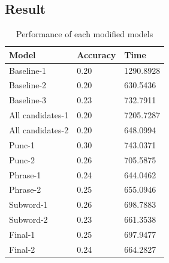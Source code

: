 \documentclass[11pt,a4paper]{article}
\begin{document}
{\renewcommand{\arraystretch}{1.2}
\begin{table}[H]
\caption{Types of modified models}
\label{tab:modification_setting}
\end{table}
}
\subsection{Result}
\label{sec:improvement}
\begin{table}[hbt!]
\begin{tabularx}{\columnwidth}{X|l|l}
\hline
\textbf{Model}   & \textbf{Accuracy} & \textbf{Time}     \\ \hline
Baseline-1       & 0.20     & 1290.8928 \\ \hline
Baseline-2       & 0.20     & 630.5436  \\ \hline
Baseline-3       & 0.23     & 732.7911  \\ \hline
All candidates-1 & 0.20     & 7205.7287 \\ \hline
All candidates-2 & 0.20     & 648.0994  \\ \hline
Punc-1           & 0.30     & 743.0371  \\ \hline
Punc-2           & 0.26     & 705.5875  \\ \hline
Phrase-1         & 0.24     & 644.0462  \\ \hline
Phrase-2         & 0.25     & 655.0946  \\ \hline
Subword-1        & 0.26     & 698.7883  \\ \hline
Subword-2        & 0.23     & 661.3538  \\ \hline
Final-1          & 0.25     & 697.9477  \\ \hline
Final-2          & 0.24     & 664.2827  \\ \hline
\end{tabularx}
\caption{Performance of each modified models}
\label{tab:result_modification}
\end{table}
\end{document}
